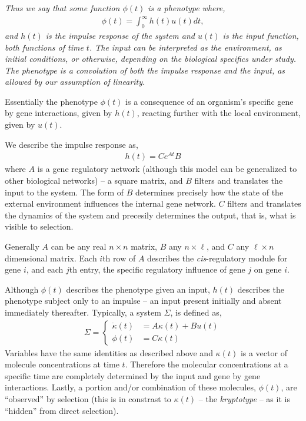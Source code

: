 \documentclass[9 pt]{article}
\newcommand{\jss}[1]{{\color{olive}\it #1}}
\newcommand{\1}{\mathbbm{1}}
\begin{document}
  \jss{  Thus we say that some function $\phi(t)$ is a phenotype where, 
  \begin{align}
    \phi(t) = \int_{0}^{\infty} h(t) u(t) dt  ,
  \end{align}
  and $h(t)$ is the \emph{impulse response} of the system and $u(t)$ is the \emph{input} function, both functions of time $t$. The input can be interpreted as the environment, as initial conditions, or otherwise, depending on the biological specifics under study. The phenotype is a convolution of both the impulse response and the input, as allowed by our assumption of linearity. 

  Essentially the phenotype $\phi(t)$ is a consequence of an organism's specific gene by gene interactions, given by $h(t)$, reacting further with the local environment, given by $u(t)$. 

  We describe the impulse response as, 
  \begin{align}
    h(t) = C e^{A t} B
  \end{align}
  where $A$ is a gene regulatory network (although this model can be generalized to other biological networks) -- a square matrix, and $B$ filters and translates the input to the system. The form of $B$ determines precisely how the state of the external environment influences the internal gene network. $C$ filters and translates the dynamics of the system and precesily determines the output, that is, what is visible to selection. 

  Generally $A$ can be any real $n \times n$ matrix, $B$ any $n \times \ell$, and $C$ any $\ell \times n$ dimensional matrix. Each $i$th row of $A$ describes the \emph{cis}-regulatory module for gene $i$, and each $j$th entry, the specific regulatory influence of gene $j$ on gene $i$. 

  Although $\phi(t)$ describes the phenotype given an input, $h(t)$ describes the phenotype subject only to an impulse -- an input present initially and absent immediately thereafter. Typically, a system $\Sigma$, is defined as,
  \begin{align}
    \Sigma = \left\{ \begin{array}{ll} \dot{\kappa}(t) &= A \kappa(t) + B u(t) \\ \phi(t) &= C \kappa(t) \end{array} \right.
  \end{align}
  Variables have the same identities as described above and $\kappa(t)$ is a vector of molecule concentrations at time $t$. Therefore the molecular concentrations at a specific time are completely determined by the input and gene by gene interactions. Lastly, a portion and/or combination of these molecules, $\phi(t)$, are ``observed'' by selection (this is in constrast to $\kappa(t)$ -- the \emph{kryptotype} -- as it is ``hidden'' from direct selection).
}
\end{document}

